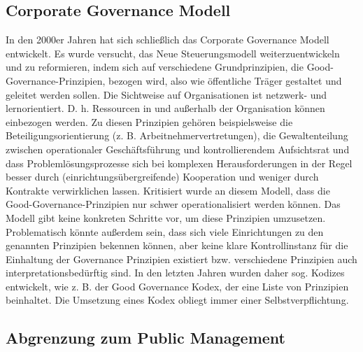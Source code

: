 \documentclass[
  letterpaper,
]{book}
\begin{document}
\subsection{Corporate Governance
Modell}\label{corporate-governance-modell}

In den 2000er Jahren hat sich schließlich das Corporate Governance
Modell entwickelt. Es wurde versucht, das Neue Steuerungsmodell
weiterzuentwickeln und zu reformieren, indem sich auf verschiedene
Grundprinzipien, die Good-Governance-Prinzipien, bezogen wird, also wie
öffentliche Träger gestaltet und geleitet werden sollen. Die Sichtweise
auf Organisationen ist netzwerk- und lernorientiert. D. h. Ressourcen in
und außerhalb der Organisation können einbezogen werden. Zu diesen
Prinzipien gehören beispielsweise die Beteiligungsorientierung (z. B.
Arbeitnehmervertretungen), die Gewaltenteilung zwischen operationaler
Geschäftsführung und kontrollierendem Aufsichtsrat und dass
Problemlösungsprozesse sich bei komplexen Herausforderungen in der Regel
besser durch (einrichtungsübergreifende) Kooperation und weniger durch
Kontrakte verwirklichen lassen. Kritisiert wurde an diesem Modell, dass
die Good-Governance-Prinzipien nur schwer operationalisiert werden
können. Das Modell gibt keine konkreten Schritte vor, um diese
Prinzipien umzusetzen. Problematisch könnte außerdem sein, dass sich
viele Einrichtungen zu den genannten Prinzipien bekennen können, aber
keine klare Kontrollinstanz für die Einhaltung der Governance Prinzipien
existiert bzw. verschiedene Prinzipien auch interpretationsbedürftig
sind. In den letzten Jahren wurden daher sog. Kodizes entwickelt, wie z.
B. der Good Governance Kodex, der eine Liste von Prinzipien beinhaltet.
Die Umsetzung eines Kodex obliegt immer einer Selbstverpflichtung.

\subsection{Abgrenzung zum Public
Management}\label{abgrenzung-zum-public-management}
\end{document}
